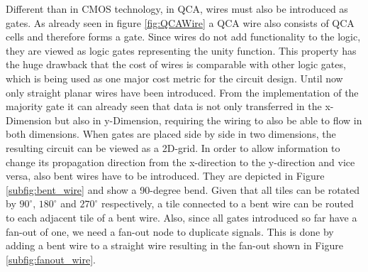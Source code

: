 Different than in CMOS technology, in QCA, wires must also be introduced as gates. As already seen in figure \ref{fig:QCAWire} a QCA wire also consists of QCA cells and therefore forms a gate. Since wires do not add functionality to the logic, they are viewed as logic gates representing the unity function. This property has the huge drawback that the cost of wires is comparable with other logic gates, which is being used as one major cost metric for the circuit design. Until now only straight planar wires have been introduced. From the implementation of the majority gate it can already seen that data is not only transferred in the x-Dimension but also in y-Dimension, requiring the wiring to also be able to flow in both dimensions. When gates are placed side by side in two dimensions, the resulting circuit can be viewed as a 2D-grid. In order to allow information to change its propagation direction from the x-direction to the y-direction and vice versa, also bent wires have to be introduced. They are depicted in Figure \ref{subfig:bent_wire} and show a 90-degree bend. Given that all tiles can be rotated by $90^{\circ}$, $180^{\circ}$ and $270^{\circ}$ respectively, a tile connected to a bent wire can be routed to each adjacent tile of a bent wire. Also, since all gates introduced so far have a fan-out of one, we need a fan-out node to duplicate signals. This is done by adding a bent wire to a straight wire resulting in the fan-out shown in Figure \ref{subfig:fanout_wire}.\\
